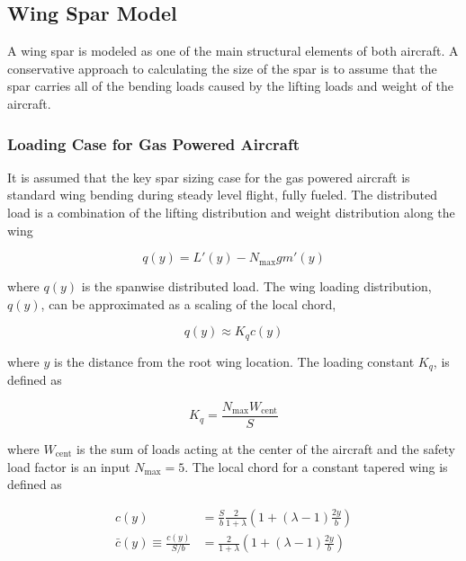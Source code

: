 \documentclass[]{aiaa-tc}%
\begin{document}
\subsection{Wing Spar Model}

A wing spar is modeled as one of the main structural elements of both aircraft. 
A conservative approach to calculating the size of the spar is to assume that the spar carries all of the bending loads caused by the lifting loads and weight of the aircraft.  

\subsubsection{Loading Case for Gas Powered Aircraft}

It is assumed that the key spar sizing case for the gas powered aircraft is standard wing bending during steady level flight, fully fueled. The distributed load is a combination of the lifting distribution and weight distribution along the wing

\begin{equation}
    \label{e:wloading}
    q(y) = L'(y) - N_{\text{max}}gm'(y)
\end{equation}

where $q(y)$ is the spanwise distributed load. 
The wing loading distribution, $q(y)$, can be approximated as a scaling of the local chord,\cite{bending}

\begin{equation}
    \label{e:wingloading}
    q(y) \approx K_q c(y) 
\end{equation}

where $y$ is the distance from the root wing location. The loading constant $K_q$\cite{bending}, is defined as

\begin{equation}
    \label{e:kq}
    K_q = \frac{N_{\text{max}}W_{\text{cent}}}{S}
\end{equation}

where $W_{\text{cent}}$ is the sum of loads acting at the center of the aircraft and the safety load factor is an input $N_{\text{max}}=5$. The local chord for a constant tapered wing\cite{bending} is defined as 

\begin{align}
    \label{e:localchord}
    c(y) &= \frac{S}{b} \frac{2}{1+\lambda} \left( 1 + (\lambda - 1) \frac{2y}{b} \right) \\
    \bar{c}(y) \equiv \frac{c(y)}{S/b} &= \frac{2}{1+\lambda} \left( 1 + (\lambda - 1) \frac{2y}{b} \right)
\end{align}
\end{document}
